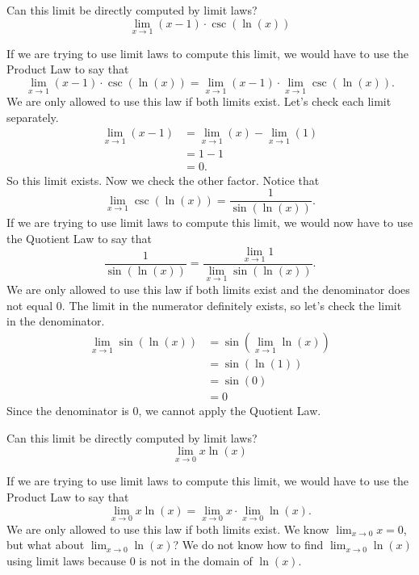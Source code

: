 \documentclass{ximera}
\begin{document}
\begin{question}
  Can this limit be directly computed by limit laws?
  \[
  \lim_{x\to 1}{(x-1)\cdot \csc(\ln(x))}
  \]
  \begin{prompt}
  \begin{multipleChoice}
  \end{multipleChoice}
  \begin{feedback}
    If we are trying to use limit laws to compute this limit, we would have to use the Product Law to say that
    \[
    \lim_{x\to 1}{(x-1)\cdot \csc(\ln(x))}= \lim_{x\to 1}{(x-1)\cdot \lim_{x\to 1}\csc(\ln(x))}.
    \]
    We are only allowed to use this law if both limits exist.  Let's
    check each limit separately.
    \begin{align*}
      \lim_{x\to 1} (x-1) &= \lim_{x\to 1} (x)-\lim_{x\to 1}(1)\\
      &=1-1\\
      &=0.
    \end{align*}
   So this limit exists. Now we check the other factor.
   Notice that
   \[
   \lim_{x\to 1}\csc(\ln(x)) = \frac{1}{\sin(\ln(x))}.
   \]
   If we are trying to use limit laws to compute this limit, we would now have to use the Quotient Law to say that
   \[
   \frac{1}{\sin(\ln(x))} = \frac{\lim_{x\to 1}1}{\lim_{x\to
       1}\sin(\ln(x))}.
   \]
   We are only allowed to use this law if both limits exist and the
   denominator does not equal $0$.  The limit in the numerator definitely
   exists, so let's check the limit in the denominator.
   \begin{align*}
   \lim_{x\to 1}\sin(\ln(x)) &= \sin(\lim_{x\to 1}\ln(x))\\
   &=\sin(\ln(1))\\
   &= \sin(0)\\
   &= 0
  \end{align*}
  Since the denominator is $0$, we cannot apply the Quotient Law.
  \end{feedback}
  \end{prompt}
\end{question}

\begin{question}
  Can this limit be directly computed by limit laws?
  \[
  \lim_{x\to 0} x\ln(x)
  \]
  \begin{prompt}
  \begin{multipleChoice}
  \end{multipleChoice}
  \begin{feedback}
  If we are trying to use limit laws to compute this limit, we would
  have to use the Product Law to say that
  \[
  \lim_{x\to 0} x\ln(x) =\lim_{x\to 0} x \cdot \lim_{x\to 0}\ln(x).
  \]
  We are only allowed to use this law if both limits exist.  We know
  $\lim_{x\to 0} x = 0$, but what about $\lim_{x\to 0}\ln(x)$?  We do
  not know how to find $\lim_{x\to 0}\ln(x)$ using limit laws because $0$
  is not in the domain of $\ln(x)$.
  \end{feedback}
  \end{prompt}
\end{question}
\end{document}
